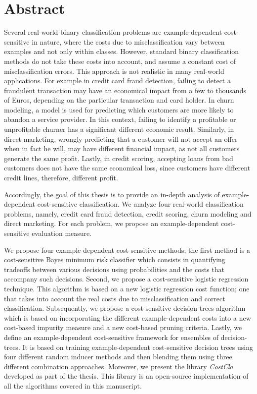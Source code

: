 \chapter*{Abstract}

Several real-world binary classification problems are example-dependent cost-sensitive in nature, where the 
costs due to misclassification vary between examples and not only within classes. However, standard binary
classification methods do not take these costs into account, and assume a constant cost of 
misclassification errors. This approach is not realistic in many real-world applications. For  
example in credit card fraud detection, failing to detect a fraudulent transaction may have an 
economical impact from a few to thousands of Euros, depending on the particular transaction and card 
holder. In churn modeling, a model is used for predicting which customers are more likely to 
abandon a service provider. In this context, failing to identify a   profitable or unprofitable 
churner has a significant different economic   result. Similarly, in direct marketing, wrongly 
predicting that a customer   will not accept an offer when in fact he will, may have different 
financial impact, as not all   customers generate the same profit. Lastly, in credit scoring, 
accepting   loans from bad customers does not have the same economical loss, since customers have 
different   credit lines, therefore, different profit.

Accordingly, the goal of this thesis is to provide an in-depth analysis of example-dependent 
cost-sensitive classification. We analyze four real-world classification problems, namely, 
credit card fraud detection, credit scoring, churn modeling and direct marketing. For each problem, 
we propose an example-dependent cost-sensitive evaluation measure.

We propose four example-dependent cost-sensitive methods; the first method is a cost-sensitive 
Bayes minimum risk classifier which consists in quantifying tradeoffs between various decisions 
using probabilities and the costs that accompany such decisions. Second, we propose a
cost-sensitive logistic regression technique. This algorithm is based on a new logistic regression 
cost function; one that takes into account the real costs due to misclassification and correct 
classification. Subsequently, we propose a cost-sensitive decision trees algorithm which is based 
on incorporating the different example-dependent costs into a new cost-based impurity measure and a 
new cost-based pruning criteria. Lastly, we define an example-dependent cost-sensitive framework 
for ensembles of decision-trees. It is based on training example-dependent cost-sensitive 
decision trees using four different random inducer methods and then blending them using three 
different combination approaches. Moreover, we present the library \mbox{\textit{CostCla}} developed 
as part of the thesis. This library is an open-source implementation of all the algorithms covered 
in this manuscript.

